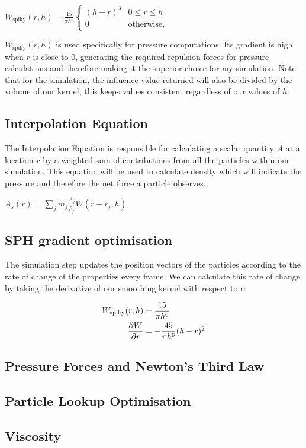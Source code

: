 \documentclass[write-up.tex]{subfiles}
\begin{document}
\begin{center}
$
    W_{\text{spiky}}(r, h) = \displaystyle \frac{15}{\pi h^6}
    \begin{cases}
        (h-r)^3 & 0 \leq r \leq h \\
        0 & \text{otherwise},
    \end{cases}
$
\end{center}


$W_{\text{spiky}}(r, h)$ is used specifically for pressure computations. Its gradient is high when $r$ is close to $0$, generating the required repulsion forces for pressure calculations and therefore making it the superior choice for my simulation. Note that for the simulation, the influence value returned will also be divided by the volume of our kernel, this keeps values consistent regardless of our values of $h$.

\subsection{Interpolation Equation}
The Interpolation Equation is responsible for calculating a scalar quantity $A$ at a location $r$ by a weighted sum of contributions from all the particles within our simulation. This equation will be used to calculate density which will indicate the pressure and therefore the net force a particle observes.
\begin{center}
$
    A_s(r) = \sum_{j} m_j \frac{A_j}{\rho_j}W(r-r_j, h)
$
\end{center}

\subsection{SPH gradient optimisation}

The simulation step updates the position vectors of the particles according to the rate of change of the properties every frame. We can calculate this rate of change by taking the derivative of our smoothing kernel with respect to r:

\begin{align*}
W_{\text{spiky}}(r, h) &= \displaystyle \frac{15}{\pi h^6} \\
\pdv{W}{r} &= -\frac{45}{\pi h^6} (h-r)^2
\end{align*}

\subsection{Pressure Forces and Newton's Third Law}

\subsection{Particle Lookup Optimisation}
\subsection{Viscosity}
\end{document}
